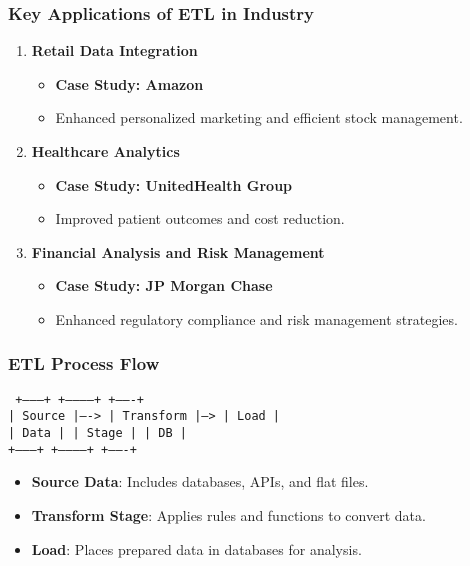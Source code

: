 \documentclass[aspectratio=169]{beamer}
\begin{document}
\begin{frame}
    \frametitle{Key Applications of ETL in Industry}
    \begin{enumerate}
        \item \textbf{Retail Data Integration}
        \begin{itemize}
            \item \textbf{Case Study: Amazon}
            \item Enhanced personalized marketing and efficient stock management.
        \end{itemize}
        
        \item \textbf{Healthcare Analytics}
        \begin{itemize}
            \item \textbf{Case Study: UnitedHealth Group}
            \item Improved patient outcomes and cost reduction.
        \end{itemize}

        \item \textbf{Financial Analysis and Risk Management}
        \begin{itemize}
            \item \textbf{Case Study: JP Morgan Chase}
            \item Enhanced regulatory compliance and risk management strategies.
        \end{itemize}
    \end{enumerate}
\end{frame}

\begin{frame}[fragile]
    \frametitle{ETL Process Flow}
    \begin{center}
        \texttt{
        +---------+           +------------+           +-------+ \\
        |  Source |---->     |  Transform |--->      |  Load | \\
        |  Data   |           |   Stage    |           |  DB   | \\
        +---------+           +------------+           +-------+
        }
    \end{center}
    \begin{itemize}
        \item \textbf{Source Data}: Includes databases, APIs, and flat files.
        \item \textbf{Transform Stage}: Applies rules and functions to convert data.
        \item \textbf{Load}: Places prepared data in databases for analysis.
    \end{itemize}
\end{frame}
\end{document}
